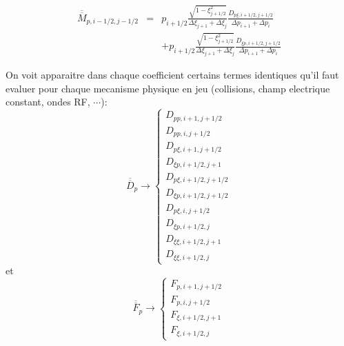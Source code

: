 \begin{eqnarray*}
\overline{\overline{M}}_{p,i-1/2,j-1/2} & = & p_{i+1/2}\frac{\sqrt{1-\xi_{j+1/2}^{2}}}{\Delta\xi_{j+1}+\Delta\xi_{j}}\frac{D_{p\xi,i+1/2,j+1/2}}{\Delta p_{i+1}+\Delta p_{i}}\\
 &  & +p_{i+1/2}\frac{\sqrt{1-\xi_{j+1/2}^{2}}}{\Delta\xi_{j+1}+\Delta\xi_{j}}\frac{D_{\xi p,i+1/2,j+1/2}}{\Delta p_{i+1}+\Delta p_{i}}\end{eqnarray*}


On voit apparaitre dans chaque coefficient certains termes identiques
qu'il faut evaluer pour chaque mecanisme physique en jeu (collisions,
champ electrique constant, ondes RF, $\cdots$): \[
\overline{\overline{D}}_{p}\rightarrow\left\{ \begin{array}{l}
D_{pp,i+1,j+1/2}\\
D_{pp,i,j+1/2}\\
D_{p\xi,i+1,j+1/2}\\
D_{\xi p,i+1/2,j+1}\\
D_{p\xi,i+1/2,j+1/2}\\
D_{\xi p,i+1/2,j+1/2}\\
D_{p\xi,i,j+1/2}\\
D_{\xi p,i+1/2,j}\\
D_{\xi\xi,i+1/2,j+1}\\
D_{\xi\xi,i+1/2,j}\end{array}\right.\]
 et \[
\overline{\overline{F}}_{p}\rightarrow\left\{ \begin{array}{l}
F_{p,i+1,j+1/2}\\
F_{p,i,j+1/2}\\
F_{\xi,i+1/2,j+1}\\
F_{\xi,i+1/2,j}\end{array}\right.\]

